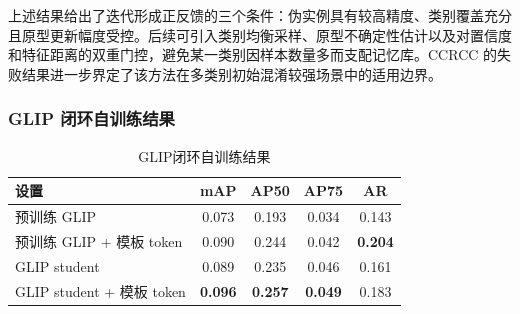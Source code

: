 \begin{table}[htbp]
\centering
\caption{框特征模板迭代结果}
\label{tab:attrip_box_token}
\end{table}

上述结果给出了迭代形成正反馈的三个条件：伪实例具有较高精度、类别覆盖充分且原型更新幅度受控。后续可引入类别均衡采样、原型不确定性估计以及对置信度和特征距离的双重门控，避免某一类别因样本数量多而支配记忆库。CCRCC 的失败结果进一步界定了该方法在多类别初始混淆较强场景中的适用边界。

\subsubsection{GLIP 闭环自训练结果}

\begin{table}[htbp]
\centering
\caption{GLIP闭环自训练结果}
\label{tab:attrip_glip_student}
\begin{tabular}{lcccc}
\toprule[1.5pt]
\textbf{设置} & \textbf{mAP} & \textbf{AP50} & \textbf{AP75} & \textbf{AR} \\ \midrule[1.2pt]
预训练 GLIP & 0.073 & 0.193 & 0.034 & 0.143 \\
预训练 GLIP + 模板 token & 0.090 & 0.244 & 0.042 & \textbf{0.204} \\
GLIP student & 0.089 & 0.235 & 0.046 & 0.161 \\
GLIP student + 模板 token & \textbf{0.096} & \textbf{0.257} & \textbf{0.049} & 0.183 \\ \bottomrule[1.5pt]
\end{tabular}
\end{table}


